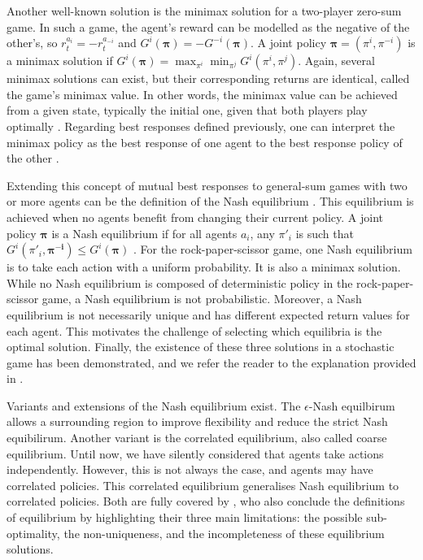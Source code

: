 Another well-known solution is the minimax solution for a two-player zero-sum game.
In such a game, the agent's reward can be modelled as the negative of the other's, so $r_t^{a_i} = -r_t^{a_{-i}}$ and $G^i(\mathbf{\pi}) = - G^{-i}(\mathbf{\pi})$.
A joint policy $\mathbf{\pi} = (\pi^i, \pi^{-i})$ is a minimax solution if $G^i(\mathbf{\pi})=\max_{\pi^i} \min_{\pi^j} G^i(\pi^i, \pi^j)$.
Again, several minimax solutions can exist, but their corresponding returns are identical, called the game's minimax value.
In other words, the minimax value can be achieved from a given state, typically the initial one, given that both players play optimally \citep{russel2010}.
Regarding best responses defined previously, one can interpret the minimax policy as the best response of one agent to the best response policy of the other \citep{marl-book}.

Extending this concept of mutual best responses to general-sum games with two or more agents can be the definition of the Nash equilibrium \citep{marl-book}.
This equilibrium is achieved when no agents benefit from changing their current policy.
A joint policy $\mathbf{\pi}$ is a Nash equilibrium if for all agents $a_i$, any $\pi'_i$ is such that $G^i(\pi'_i , \mathbf{\pi^{-i}}) \le G^i(\mathbf{\pi})$ \citep{nash1950equilibrium}.
For the rock-paper-scissor game, one Nash equilibrium is to take each action with a uniform probability.
It is also a minimax solution.
While no Nash equilibrium is composed of deterministic policy in the rock-paper-scissor game, a Nash equilibrium is not probabilistic.
Moreover, a Nash equilibrium is not necessarily unique and has different expected return values for each agent.
This motivates the challenge of selecting which equilibria is the optimal solution.
Finally, the existence of these three solutions in a stochastic game has been demonstrated, and we refer the reader to the explanation provided in \citep{marl-book}.

Variants and extensions of the Nash equilibrium exist.
The $\epsilon$-Nash equilbirum allows a surrounding region to improve flexibility and reduce the strict Nash equibilirum.
Another variant is the correlated equilibrium, also called coarse equilibrium.
Until now, we have silently considered that agents take actions independently.
However, this is not always the case, and agents may have correlated policies.
This correlated equilibrium generalises Nash equilibrium to correlated policies.
Both are fully covered by \cite{marl-book}, who also conclude the definitions of equilibrium by highlighting their three main limitations: the possible sub-optimality, the non-uniqueness, and the incompleteness of these equilibrium solutions.

